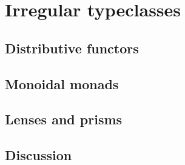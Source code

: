 
\chapter{Irregular typeclasses}

\section{Distributive functors}

\section{Monoidal monads}

\section{Lenses and prisms}

\section{Discussion}

\begin{comment}
\end{comment}

